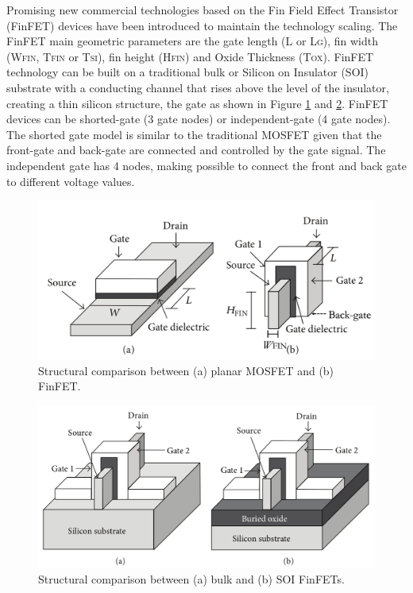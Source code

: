 \documentclass[ecp,tc, english]{iiufrgs}
\begin{document}
Promising new commercial technologies based on the Fin Field Effect Transistor (FinFET) devices have been introduced to maintain the technology scaling. The FinFET main geometric parameters are the gate length (L or L\textsc{g}), fin width (W\textsc{fin}, T\textsc{fin} or T\textsc{si}), fin height (H\textsc{fin}) and Oxide Thickness (T\textsc{ox}). FinFET technology can be built on a traditional bulk or Silicon on Insulator (SOI) substrate with a conducting channel that rises above the level of the insulator, creating a thin silicon structure, the gate as shown in Figure \ref{mosfetvsfinfet} and \ref{bulkvssoi}. FinFET devices can be shorted-gate (3 gate nodes) or independent-gate (4 gate nodes). The shorted gate model is similar to the traditional MOSFET given that the front-gate and back-gate are connected and controlled by the gate signal. The independent gate has 4 nodes, making possible to connect the front and back gate to different voltage values.

\begin{figure}[H]
\centering
\includegraphics[width=\textwidth, trim={0 0cm 0 0cm},clip]{finfet.pdf}
\caption{Structural comparison between (a) planar MOSFET and (b) FinFET.}
\label{mosfetvsfinfet}
\end{figure}

\begin{figure}[H]
\centering
\includegraphics[width=\textwidth, trim={0 0cm 0 0cm},clip]{finfet2.png}
\caption{Structural comparison between (a) bulk and (b) SOI FinFETs.}
\label{bulkvssoi}
\end{figure}
\end{document}
